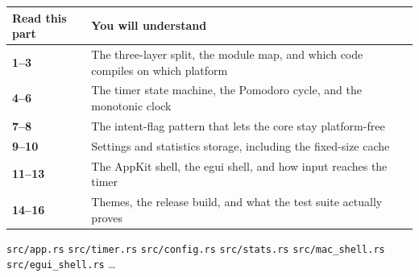 \vspace{6mm}

\begin{center}
\begin{minipage}{0.92\linewidth}
\small
\begin{center}
\begin{tabular}{@{}>{\bfseries\sffamily}p{34mm} p{96mm}@{}}
\toprule
Read this part & You will understand \\
\midrule
\rowcolor{corefill!55}
1--3 & The three-layer split, the module map, and which code compiles on which platform \\
\rowcolor{corefill!55}
4--6 & The timer state machine, the Pomodoro cycle, and the monotonic clock \\
\rowcolor{corefill!55}
7--8 & The intent-flag pattern that lets the core stay platform-free \\
\rowcolor{corefill!55}
9--10 & Settings and statistics storage, including the fixed-size cache \\
\rowcolor{corefill!55}
11--13 & The AppKit shell, the egui shell, and how input reaches the timer \\
\rowcolor{corefill!55}
14--16 & Themes, the release build, and what the test suite actually proves \\
\bottomrule
\end{tabular}
\end{center}
\end{minipage}
\end{center}

\vfill
\begin{center}
\sffamily\footnotesize\color{softink}
\texttt{src/app.rs} \textbullet{} \texttt{src/timer.rs} \textbullet{} \texttt{src/config.rs}
\textbullet{} \texttt{src/stats.rs} \textbullet{} \texttt{src/mac\_shell.rs}
\textbullet{} \texttt{src/egui\_shell.rs} \textbullet{} \dots
\end{center}
\clearpage